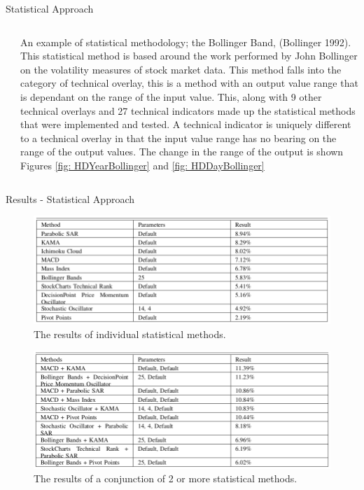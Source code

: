 \documentclass[final]{beamer}
\begin{document}
\begin{frame}{}
\begin{columns}[t]
\begin{column}{.48\linewidth}
\begin{block}{Statistical Approach}
\begin{columns}[t]
\begin{column}{0.48\linewidth}
         \end{column}
         
         \begin{column}{0.42\linewidth}
         
         An example of statistical methodology; the Bollinger Band, (Bollinger 1992). This statistical method is based around the work performed by John Bollinger on the volatility measures of stock market data. This method falls into the category of technical overlay, this is a method with an output value range that is dependant on the range of the input value. This, along with 9 other technical overlays and 27 technical indicators made up the statistical methods that were implemented and tested. A technical indicator is uniquely different to a technical overlay in that the input value range has no bearing on the range of the output values. The change in the range of the output is shown Figures \ref{fig: HDYearBollinger} and \ref{fig: HDDayBollinger}
         
         \end{column}
         
         \end{columns}

        \end{block}
        
        
         \begin{block}{Results - Statistical Approach}
         
		 \begin{figure}
         \includegraphics[width=0.8\columnwidth]{table1}
         \caption{The results of individual statistical methods.}
         \label{table: Individual Results}
         \end{figure}
         
         \begin{figure}
         \includegraphics[width=0.8\columnwidth]{table2}
         \caption{The results of a conjunction of 2 or more statistical methods.}
         \label{table: Conjunction Results}
         \end{figure}


\end{block}
\end{column}
\end{columns}
\end{frame}
\end{document}
